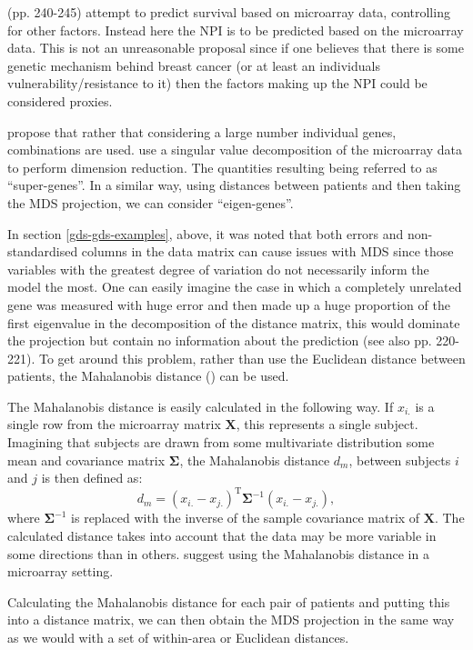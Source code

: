 \cite{ernstbook} (pp. 240-245) attempt to predict survival based on microarray data, controlling for other factors. Instead here the NPI is to be predicted based on the microarray data. This is not an unreasonable proposal since if one believes that there is some genetic mechanism behind breast cancer (or at least an individuals vulnerability/resistance to it) then the factors making up the NPI could be considered proxies. 

\cite{spang2002} propose that rather that considering a large number individual genes, combinations are used. \cite{spang2002} use a singular value decomposition of the microarray data to perform dimension reduction. The quantities resulting being referred to as ``super-genes''. In a similar way, using distances between patients and then taking the MDS projection, we can consider ``eigen-genes''.

In section \ref{gds-gds-examples}, above, it was noted that both errors and non-standardised columns in the data matrix can cause issues with MDS since those variables with the greatest degree of variation do not necessarily inform the model the most. One can easily imagine the case in which a completely unrelated gene was measured with huge error and then made up a huge proportion of the first eigenvalue in the decomposition of the distance matrix, this would dominate the projection but contain no information about the prediction (see also \cite{ernstbook} pp. 220-221). To get around this problem, rather than use the Euclidean distance between patients, the Mahalanobis distance (\cite{mahalanobis}) can be used.

The Mahalanobis distance is easily calculated in the following way. If $x_{i.}$ is a single row from the microarray matrix $\mathbf{X}$, this represents a single subject. Imagining that subjects are drawn from some multivariate distribution some mean and covariance matrix $\mathbf{\Sigma}$, the Mahalanobis distance $d_m$, between subjects $i$ and $j$ is then defined as:
\begin{equation}
d_m = (x_{i.} - x_{j.})^\text{T} \mathbf{\Sigma}^{-1} (x_{i.} - x_{j.}),
\end{equation}
where $\mathbf{\Sigma}^{-1}$ is replaced with the inverse of the sample covariance matrix of $\mathbf{X}$. The calculated distance takes into account that the data may be more variable in some directions than in others. \cite{gentleman2005} suggest using the Mahalanobis distance in a microarray setting.

Calculating the Mahalanobis distance for each pair of patients and putting this into a distance matrix, we can then obtain the MDS projection in the same way as we would with a set of within-area or Euclidean distances.

